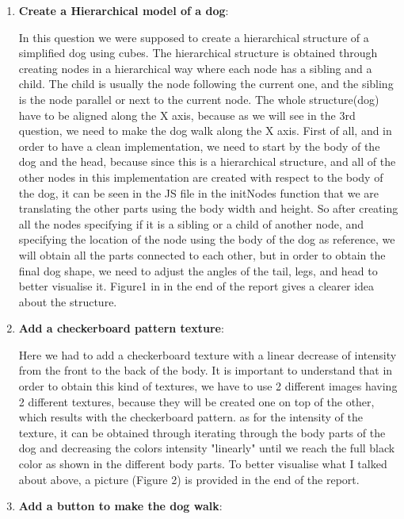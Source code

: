 \documentclass{article}
\begin{document}
\begin{enumerate}
\item \textbf{Create a Hierarchical model of a dog}:

In this question we were supposed to create a hierarchical structure of a simplified dog using cubes. The hierarchical structure is obtained through creating nodes in a hierarchical way where each node has a sibling and a child. The child is usually the node following the current one, and the sibling is the node parallel or next to the current node. The whole structure(dog) have to be aligned along the X axis, because as we will see in the 3rd question, we need to make the dog walk along the X axis. First of all, and in order to have a clean implementation, we need to start by the body of the dog and the head, because since this is a hierarchical structure, and all of the other nodes in this implementation are created with respect to the body of the dog, it can be seen in the JS file in the initNodes function that we are translating the other parts using the body width and height. So after creating all the nodes specifying if it is a sibling or a child of another node, and specifying the location of the node using the body of the dog as reference, we will obtain all the parts connected to each other, but in order to obtain the final dog shape, we need to adjust the angles of the tail, legs, and head to better visualise it. Figure1 in in the end of the report gives a clearer idea about the structure.

\item \textbf{Add a checkerboard pattern texture}:

Here we had to add a checkerboard texture with a linear decrease of intensity from the front to the back of the body. It is important to understand that in order to obtain this kind of textures, we have to use 2 different images having 2 different textures, because they will be created one on top of the other, which results with the checkerboard pattern. as for the intensity of the texture, it can be obtained through iterating through the body parts of the dog and decreasing the colors intensity "linearly" until we reach the full black color as shown in the different body parts. To better visualise what I talked about above, a picture (Figure 2) is provided in the end of the report.


\item \textbf{Add a button to make the dog walk}:


\end{enumerate}
\end{document}
